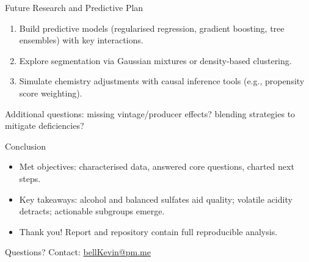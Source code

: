 \documentclass[aspectratio=169]{beamer}
\begin{document}
\begin{frame}{Future Research and Predictive Plan}
  \begin{enumerate}
    \item Build predictive models (regularised regression, gradient boosting, tree ensembles) with key interactions.
    \item Explore segmentation via Gaussian mixtures or density-based clustering.
    \item Simulate chemistry adjustments with causal inference tools (e.g., propensity score weighting).
  \end{enumerate}
  \vspace{0.5em}
  \small Additional questions: missing vintage/producer effects? blending strategies to mitigate deficiencies?
\end{frame}

\begin{frame}{Conclusion}
  \begin{itemize}
    \item Met objectives: characterised data, answered core questions, charted next steps.
    \item Key takeaways: alcohol and balanced sulfates aid quality; volatile acidity detracts; actionable subgroups emerge.
    \item Thank you! Report and repository contain full reproducible analysis.
  \end{itemize}
\end{frame}

\begin{frame}[standout]
  Questions?\newline
  \small Contact: \href{mailto:bellKevin@pm.me}{bellKevin@pm.me}
\end{frame}
\end{document}
